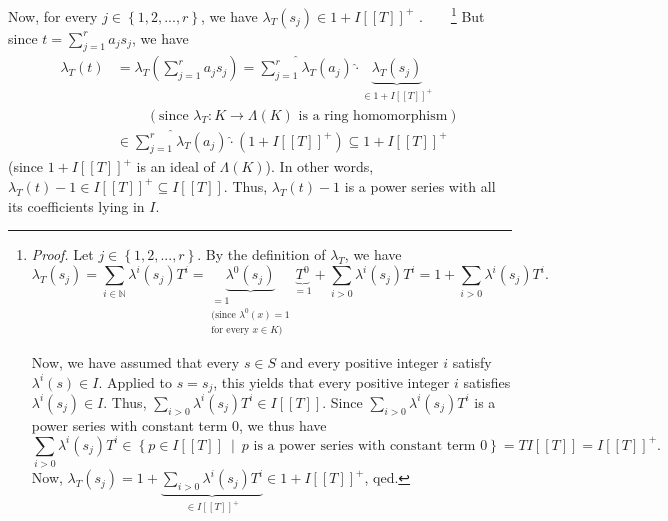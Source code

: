 \documentclass[numbers=enddot,12pt,final,onecolumn,notitlepage]{scrartcl}%
\begin{document}
Now, for every $j\in\left\{  1,2,...,r\right\}  $, we have $\lambda_{T}\left(
s_{j}\right)  \in1+I\left[  \left[  T\right]  \right]  ^{+}$%
.\ \ \ \ \footnote{\textit{Proof.} Let $j\in\left\{  1,2,...,r\right\}  $. By
the definition of $\lambda_{T}$, we have%
\[
\lambda_{T}\left(  s_{j}\right)  =\sum\limits_{i\in\mathbb{N}}\lambda
^{i}\left(  s_{j}\right)  T^{i}=\underbrace{\lambda^{0}\left(  s_{j}\right)
}_{\substack{=1\\\text{(since }\lambda^{0}\left(  x\right)  =1\\\text{for
every }x\in K\text{)}}}\underbrace{T^{0}}_{=1}+\sum\limits_{i>0}\lambda
^{i}\left(  s_{j}\right)  T^{i}=1+\sum\limits_{i>0}\lambda^{i}\left(
s_{j}\right)  T^{i}.
\]
\par
Now, we have assumed that every $s\in S$ and every positive integer $i$
satisfy $\lambda^{i}\left(  s\right)  \in I$. Applied to $s=s_{j}$, this
yields that every positive integer $i$ satisfies $\lambda^{i}\left(
s_{j}\right)  \in I$. Thus, $\sum\limits_{i>0}\lambda^{i}\left(  s_{j}\right)
T^{i}\in I\left[  \left[  T\right]  \right]  $. Since $\sum\limits_{i>0}%
\lambda^{i}\left(  s_{j}\right)  T^{i}$ is a power series with constant term
$0$, we thus have%
\[
\sum\limits_{i>0}\lambda^{i}\left(  s_{j}\right)  T^{i}\in\left\{  p\in
I\left[  \left[  T\right]  \right]  \ \mid\ p\text{ is a power series with
constant term }0\right\}  =TI\left[  \left[  T\right]  \right]  =I\left[
\left[  T\right]  \right]  ^{+}.
\]
Now, $\lambda_{T}\left(  s_{j}\right)  =1+\underbrace{\sum\limits_{i>0}%
\lambda^{i}\left(  s_{j}\right)  T^{i}}_{\in I\left[  \left[  T\right]
\right]  ^{+}}\in1+I\left[  \left[  T\right]  \right]  ^{+}$, qed.} But since
$t=\sum\limits_{j=1}^{r}a_{j}s_{j}$, we have%
\begin{align*}
\lambda_{T}\left(  t\right)   &  =\lambda_{T}\left(  \sum\limits_{j=1}%
^{r}a_{j}s_{j}\right)  =\widehat{\sum\limits_{j=1}^{r}}\lambda_{T}\left(
a_{j}\right)  \widehat{\cdot}\underbrace{\lambda_{T}\left(  s_{j}\right)
}_{\in1+I\left[  \left[  T\right]  \right]  ^{+}}\\
&  \ \ \ \ \ \ \ \ \ \ \left(  \text{since }\lambda_{T}:K\rightarrow
\Lambda\left(  K\right)  \text{ is a ring homomorphism}\right) \\
&  \in\widehat{\sum\limits_{j=1}^{r}}\lambda_{T}\left(  a_{j}\right)
\widehat{\cdot}\left(  1+I\left[  \left[  T\right]  \right]  ^{+}\right)
\subseteq1+I\left[  \left[  T\right]  \right]  ^{+}%
\end{align*}
(since $1+I\left[  \left[  T\right]  \right]  ^{+}$ is an ideal of
$\Lambda\left(  K\right)  $). In other words, $\lambda_{T}\left(  t\right)
-1\in I\left[  \left[  T\right]  \right]  ^{+}\subseteq I\left[  \left[
T\right]  \right]  $. Thus, $\lambda_{T}\left(  t\right)  -1$ is a power
series with all its coefficients lying in $I$.
\end{document}
